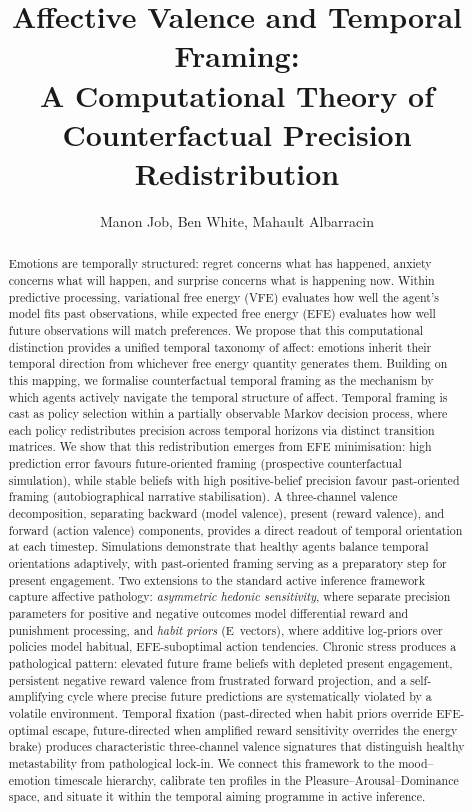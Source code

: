 \documentclass[11pt,a4paper]{article}
\title{Affective Valence and Temporal Framing:\\
       A Computational Theory of Counterfactual Precision Redistribution}
\author{Manon Job, Ben White, Mahault Albarracin}
\date{}
\begin{document}
\maketitle

\begin{abstract}
Emotions are temporally structured: regret concerns what has happened, anxiety concerns what will happen, and surprise concerns what is happening now. Within predictive processing, variational free energy (VFE) evaluates how well the agent's model fits past observations, while expected free energy (EFE) evaluates how well future observations will match preferences. We propose that this computational distinction provides a unified temporal taxonomy of affect: emotions inherit their temporal direction from whichever free energy quantity generates them. Building on this mapping, we formalise counterfactual temporal framing as the mechanism by which agents actively navigate the temporal structure of affect. Temporal framing is cast as policy selection within a partially observable Markov decision process, where each policy redistributes precision across temporal horizons via distinct transition matrices. We show that this redistribution emerges from EFE minimisation: high prediction error favours future-oriented framing (prospective counterfactual simulation), while stable beliefs with high positive-belief precision favour past-oriented framing (autobiographical narrative stabilisation). A three-channel valence decomposition, separating backward (model valence), present (reward valence), and forward (action valence) components, provides a direct readout of temporal orientation at each timestep. Simulations demonstrate that healthy agents balance temporal orientations adaptively, with past-oriented framing serving as a preparatory step for present engagement. Two extensions to the standard active inference framework capture affective pathology: \emph{asymmetric hedonic sensitivity}, where separate precision parameters for positive and negative outcomes model differential reward and punishment processing, and \emph{habit priors} (E~vectors), where additive log-priors over policies model habitual, EFE-suboptimal action tendencies. Chronic stress produces a pathological pattern: elevated future frame beliefs with depleted present engagement, persistent negative reward valence from frustrated forward projection, and a self-amplifying cycle where precise future predictions are systematically violated by a volatile environment. Temporal fixation (past-directed when habit priors override EFE-optimal escape, future-directed when amplified reward sensitivity overrides the energy brake) produces characteristic three-channel valence signatures that distinguish healthy metastability from pathological lock-in. We connect this framework to the mood--emotion timescale hierarchy, calibrate ten profiles in the Pleasure--Arousal--Dominance space, and situate it within the temporal aiming programme in active inference.
\end{abstract}
\end{document}

